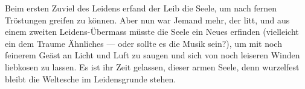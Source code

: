 Beim ersten Zuviel des Leidens erfand der Leib die Seele, um nach fernen Tröstungen greifen zu können. Aber nun war Jemand mehr, der litt, und aus einem zweiten Leidens-Übermass müsste die Seele ein Neues erfinden (vielleicht ein dem Traume Ähnliches — oder sollte es die Musik sein?), um mit noch feinerem Geäst an Licht und Luft zu saugen und sich von noch leiseren Winden liebkosen zu lassen. Es ist ihr Zeit gelassen, dieser armen Seele, denn wurzelfest bleibt die Weltesche im Leidensgrunde stehen.
\par

